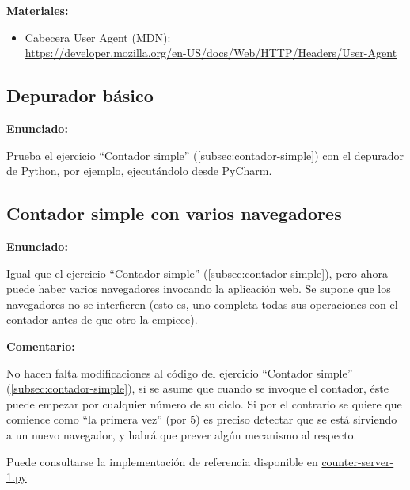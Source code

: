 \textbf{Materiales:}

\begin{itemize}
\item Cabecera User Agent (MDN): \\
  \url{https://developer.mozilla.org/en-US/docs/Web/HTTP/Headers/User-Agent}
\end{itemize}


\subsection{Depurador básico}
\label{subsec:depurador-basico}

\textbf{Enunciado:}

Prueba el ejercicio ``Contador simple'' (\ref{subsec:contador-simple}) con el depurador de Python, por ejemplo, ejecutándolo desde PyCharm.


\subsection{Contador simple con varios navegadores}
\label{subsec:contador-simple-varios}

\textbf{Enunciado:}

Igual que el ejercicio ``Contador simple'' (\ref{subsec:contador-simple}), pero ahora puede haber varios navegadores invocando la aplicación web. Se supone que los navegadores no se interfieren (esto es, uno completa todas sus operaciones con el contador antes de que otro la empiece).

\textbf{Comentario:}

No hacen falta modificaciones al código del ejercicio ``Contador simple'' (\ref{subsec:contador-simple}), si se asume que cuando se invoque el contador, éste puede empezar por cualquier número de su ciclo. Si por el contrario se quiere que comience como ``la primera vez'' (por 5) es preciso detectar que se está sirviendo a un nuevo navegador, y habrá que prever algún mecanismo al respecto.

Puede consultarse la implementación de referencia disponible en
\href{https://github.com/CursosWeb/Code/blob/master/Python-Web/counter/counter-server-1.py}{counter-server-1.py}

